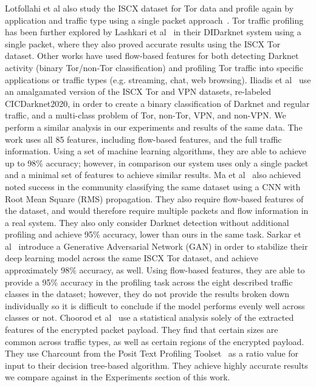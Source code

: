 Lotfollahi et al also study the ISCX dataset for Tor data and profile again by application and traffic type using a single packet approach~\cite{deeppacket}. Tor traffic profiling has been further explored by Lashkari et al~\cite{didarknet} in their DIDarknet system using a single packet, where they also proved accurate results using the ISCX Tor dataset. Other works have used flow-based features for both detecting Darknet activity (binary Tor/non-Tor classification) and profiling Tor traffic into specific applications or traffic types (e.g. streaming, chat, web browsing). Iliadis et al~\cite{iliadis2021darknet} use an amalgamated version of the ISCX Tor and VPN datasets, re-labeled CICDarknet2020, in order to create a binary classification of Darknet and regular traffic, and a multi-class problem of Tor, non-Tor, VPN, and non-VPN. We perform a similar analysis in our experiments and results of the same data. The work uses all 85 features, including flow-based features, and the full traffic information. Using a set of machine learning algorithms, they are able to achieve up to 98\% accuracy; however, in comparison our system uses only a single packet and a minimal set of features to achieve similar results. Ma et al~\cite{Ma2021dark} also achieved noted success in the community classifying the same dataset using a CNN with Root Mean Square (RMS) propagation. They also require flow-based features of the dataset, and would therefore require multiple packets and flow information in a real system. They also only consider Darknet detection without additional profiling and achieve 95\% accuracy, lower than ours in the same task. Sarkar et al~\cite{sarkar2020detection} introduce a Generative Adversarial Network (GAN) in order to stabilize their deep learning model across the same ISCX Tor dataset, and achieve approximately 98\% accuracy, as well. Using flow-based features, they are able to provide a 95\% accuracy in the profiling task across the eight described traffic classes in the dataset; however, they do not provide the results broken down individually so it is difficult to conclude if the model performs evenly well across classes or not. Choorod et al~\cite{choorod2022tor} use a statistical analysis solely of the extracted features of the encrypted packet payload. They find that certain sizes are common across traffic types, as well as certain regions of the encrypted payload. They use Charcount from the Posit Text Profiling Toolset~\cite{Weir2007ThePT} as a ratio value for input to their decision tree-based algorithm. They achieve highly accurate results we compare against in the Experiments section of this work.

